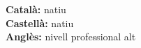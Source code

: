 

\begin{cvparagraph}

\textbf{Català:} natiu\\
\textbf{Castellà:} natiu\\
\textbf{Anglès:} nivell professional alt
\end{cvparagraph}